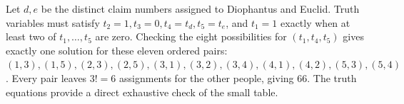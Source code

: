 Let $d,e$ be the distinct claim numbers assigned to Diophantus and Euclid. Truth variables must satisfy $t_2=1,t_3=0,t_4=t_d,t_5=t_e$, and $t_1=1$ exactly when at least two of $t_1,\ldots,t_5$ are zero. Checking the eight possibilities for $(t_1,t_4,t_5)$ gives exactly one solution for these eleven ordered pairs: $(1,3),(1,5),(2,3),(2,5),(3,1),(3,2),(3,4),(4,1),(4,2),(5,3),(5,4)$. Every pair leaves $3!=6$ assignments for the other people, giving $\boxed{66}$. The truth equations provide a direct exhaustive check of the small table.
